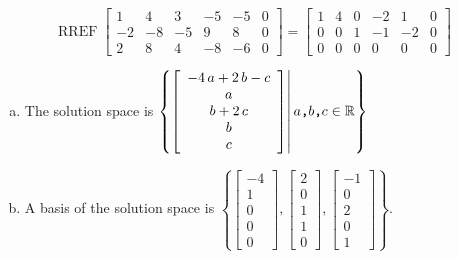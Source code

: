 \begin{exerciseAnswer} 


\[\operatorname{RREF} \left[\begin{array}{ccccc|c}
1 & 4 & 3 & -5 & -5 & 0 \\
-2 & -8 & -5 & 9 & 8 & 0 \\
2 & 8 & 4 & -8 & -6 & 0
\end{array}\right] = \left[\begin{array}{ccccc|c}
1 & 4 & 0 & -2 & 1 & 0 \\
0 & 0 & 1 & -1 & -2 & 0 \\
0 & 0 & 0 & 0 & 0 & 0
\end{array}\right] \]


\begin{enumerate}[(a)]
\item The solution space is \( \left\{ \left[\begin{array}{c}
-4 \, a + 2 \, b - c \\
a \\
b + 2 \, c \\
b \\
c
\end{array}\right] \middle|\,a\text{\texttt{,}}b\text{\texttt{,}}c\in\mathbb{R}\right\} \)
\item A basis of the solution space is \( \left\{ \left[\begin{array}{c}
-4 \\
1 \\
0 \\
0 \\
0
\end{array}\right] , \left[\begin{array}{c}
2 \\
0 \\
1 \\
1 \\
0
\end{array}\right] , \left[\begin{array}{c}
-1 \\
0 \\
2 \\
0 \\
1
\end{array}\right] \right\} \).
\end{enumerate}
    
\end{exerciseAnswer}
    

